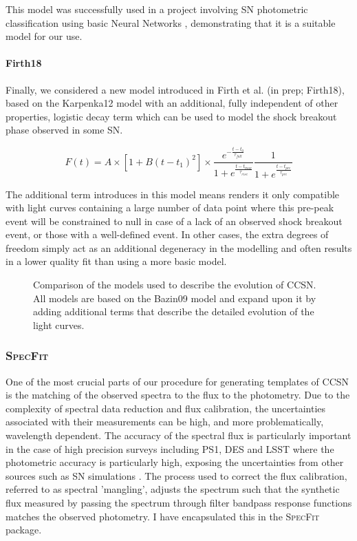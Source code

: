 This model was successfully used in a project involving SN photometric classification using basic Neural Networks \citep{Karpenka2012}, demonstrating that it is a suitable model for our use.

\paragraph{Firth18}
Finally, we considered a new model introduced in Firth et al. (in prep; Firth18), based on the Karpenka12 model with an additional, fully independent of other properties, logistic decay term which can be used to model the shock breakout phase observed in some SN.

\begin{equation}
  F(t) = A \times [1 + B(t - {t_1})^2] \times \frac{e^{-\frac{t - t_{0}}{\tau_{fall}}}} {1 + e^{\frac{t - t_{max}}{\tau_{rise}}}} \frac{1}{1 + e^{\frac{t - t_{pre}}{\tau_{pre}}}}
\end{equation}

The additional term introduces in this model means renders it only compatible with light curves containing a large number of data point where this pre-peak event will be constrained to null in case of a lack of an observed shock breakout event, or those with a well-defined event. In other cases, the extra degrees of freedom simply act as an additional degeneracy in the modelling and often results in a lower quality fit than using a more basic model.

\begin{figure}
  \caption{Comparison of the models used to describe the evolution of CCSN. All models are based on the Bazin09 model and expand upon it by adding additional terms that describe the detailed evolution of the light curves.}
  \label{fig:CCSNModelFits}
\end{figure}

\subsubsection{\textsc{SpecFit}}
One of the most crucial parts of our procedure for generating templates of CCSN is the matching of the observed spectra to the flux to the photometry. Due to the complexity of spectral data reduction and flux calibration, the uncertainties associated with their measurements can be high, and more problematically, wavelength dependent. The accuracy of the spectral flux is particularly important in the case of high precision surveys including PS1, DES and LSST where the photometric accuracy is particularly high, exposing the uncertainties from other sources such as SN simulations \citep{Jones2016}. The process used to correct the flux calibration, referred to as spectral 'mangling', adjusts the spectrum such that the synthetic flux measured by passing the spectrum through filter bandpass response functions matches the observed photometry. I have encapsulated this in the \textsc{SpecFit} package.

